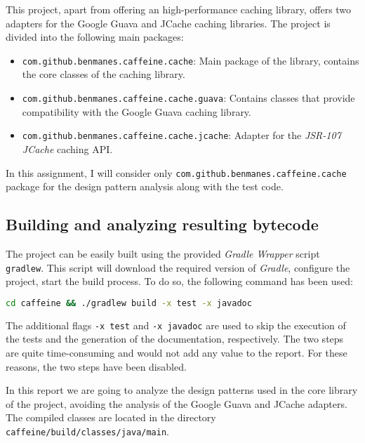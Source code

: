 This project, apart from offering an high-performance caching library, offers two adapters for the Google Guava and JCache caching libraries. The project is divided into the following main packages:

\begin{itemize}
	\item \texttt{com.github.benmanes.caffeine.cache}: Main package of the library, contains the core classes of the caching library.
	\item \texttt{com.github.benmanes.caffeine.cache.guava}: Contains classes that provide compatibility with the Google Guava caching library. \cite{caffeine:guava}
	\item \texttt{com.github.benmanes.caffeine.cache.jcache}: Adapter for the \textit{JSR-107 JCache} caching API. \cite{caffeine:jcache}
\end{itemize}

\noindent In this assignment, I will consider only \texttt{com.github.benmanes.caffeine.cache} package for the design pattern analysis along with the test code.

\subsection{Building and analyzing resulting bytecode}
\label{sec:building}

The project can be easily built using the provided \textit{Gradle Wrapper} script \texttt{gradlew}. This script will download the required version of \textit{Gradle}, configure the project, start the build process. To do so, the following command has been used:

\begin{lstlisting}[language=bash, caption={Building the Caffeine project with Gradle}]
              cd caffeine && ./gradlew build -x test -x javadoc
\end{lstlisting}

\noindent The additional flags \texttt{-x test} and \texttt{-x javadoc} are used to skip the execution of the tests and the generation of the documentation, respectively. The two steps are quite time-consuming and would not add any value to the report. For these reasons, the two steps have been disabled.

In this report we are going to analyze the design patterns used in the core library of the project, avoiding the analysis of the Google Guava and JCache adapters. The compiled classes are located in the directory \texttt{caffeine/build/classes/java/main}.

